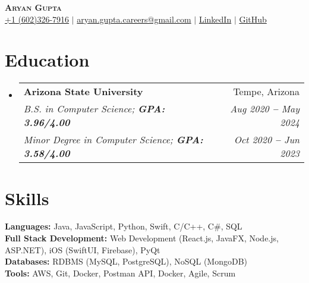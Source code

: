 \documentclass[letterpaper,11pt]{article}
\makeatletter
\newcommand{\resumeEducationHeading}[6]{
  \vspace{-2pt}\item
    \begin{tabular*}{0.97\textwidth}[t]{l@{\extracolsep{\fill}}r}
      \textbf{#1} & #2 \\
      \textit{\small#3} & \textit{\small #4} \\
      \textit{\small#5} & \textit{\small #6} \\
    \end{tabular*}\vspace{-5pt}
}
\newcommand{\resumeSubHeadingListStart}{\begin{itemize}[leftmargin=0.15in, label={}]}
\newcommand{\resumeSubHeadingListEnd}{\end{itemize}}
\makeatother
\begin{document}

\begin{center}
    \textbf{\Huge \scshape Aryan Gupta} \\ \vspace{3pt}
    \small
    \faMobile \hspace{.5pt} \href{tel:6023267916}{+1 (602)326-7916}
    $|$
    \faAt \hspace{.5pt} \href{mailto:aryan.gupta.careers@gmail.com}{aryan.gupta.careers@gmail.com}
    $|$
    \faLinkedinSquare \hspace{.5pt} \href{https://www.linkedin.com/in/agupt295}{LinkedIn}
    $|$
    \faGithub \hspace{.5pt} \href{https://github.com/agupt295}{GitHub}
\end{center}




\section{Education}
  \resumeSubHeadingListStart
    
    \resumeEducationHeading
      {Arizona State University}{Tempe, Arizona}
      {B.S. in Computer Science;   \textbf{GPA: 3.96/4.00}}{Aug 2020 \textbf{--} May 2024}
      {Minor Degree in Computer Science; \textbf{GPA: 3.58/4.00}}{Oct 2020 \textbf{--} Jun 2023}
  \resumeSubHeadingListEnd


\section{Skills}
  \resumeSubHeadingListStart
    \small{\item{
      \textbf{Languages:}{ Java, JavaScript, Python, Swift, C/C++, C\#, SQL } \\ \vspace{3pt}
      \textbf{Full Stack Development:}{ Web Development (React.js, JavaFX, Node.js, ASP.NET), iOS (SwiftUI, Firebase), PyQt } \\ \vspace{3pt}
      \textbf{Databases:}{ RDBMS (MySQL, PostgreSQL), NoSQL (MongoDB) } \\ \vspace{3pt}
      \textbf{Tools:}{ AWS, Git, Docker, Postman API, Docker, Agile, Scrum } \\ \vspace{3pt}
    }}
  \resumeSubHeadingListEnd
\end{document}
